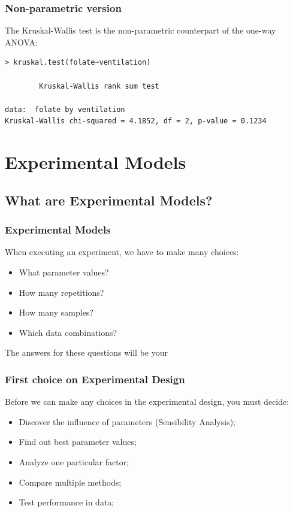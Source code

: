 \documentclass[10pt]{beamer}
\begin{document}
\begin{frame}
  \frametitle{Non-parametric version}
  The Kruskal-Wallis test is the non-parametric counterpart of the one-way ANOVA:
  \begin{block}{}
{\small
\begin{verbatim}
> kruskal.test(folate~ventilation)

        Kruskal-Wallis rank sum test

data:  folate by ventilation 
Kruskal-Wallis chi-squared = 4.1852, df = 2, p-value = 0.1234
\end{verbatim}}
  \end{block}
\end{frame}


\section{Experimental Models}
\subsection{What are Experimental Models?}
\begin{frame}
  \frametitle{Experimental Models}
  When executing an experiment, we have to make many choices:
  \begin{itemize}
  \item What parameter values?
  \item How many repetitions?
  \item How many samples?
  \item Which data combinations?
  \end{itemize}
  The answers for these questions will be your 
\end{frame}

\begin{frame}
  \frametitle{First choice on Experimental Design}
  \begin{block}{}
    Before we can make any choices in the experimental design, you
    must decide: 
  \end{block}
  \begin{itemize}
  \item Discover the influence of parameters (Sensibility Analysis);
  \item Find out best parameter values;
  \item Analyze one particular factor;
  \item Compare multiple methods;
  \item Test performance in data;
  \end{itemize}
\end{frame}
\end{document}
